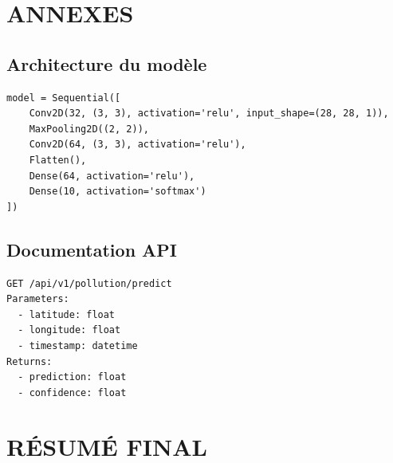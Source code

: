 \documentclass[12pt,a4paper]{report}
\begin{document}
\newpage
{}
{}
\printindex

\newpage
{}
{}



\appendix
\chapter*{ANNEXES}
\section{Architecture du modèle}
\begin{lstlisting}
model = Sequential([
    Conv2D(32, (3, 3), activation='relu', input_shape=(28, 28, 1)),
    MaxPooling2D((2, 2)),
    Conv2D(64, (3, 3), activation='relu'),
    Flatten(),
    Dense(64, activation='relu'),
    Dense(10, activation='softmax')
])
\end{lstlisting}

\section{Documentation API}
\begin{verbatim}
GET /api/v1/pollution/predict
Parameters:
  - latitude: float
  - longitude: float
  - timestamp: datetime
Returns:
  - prediction: float
  - confidence: float
\end{verbatim}

\newpage
\thispagestyle{empty}
\mbox{}

\newpage
{}
{}
\chapter*{RÉSUMÉ FINAL}
\lipsum[11]
\end{document}
